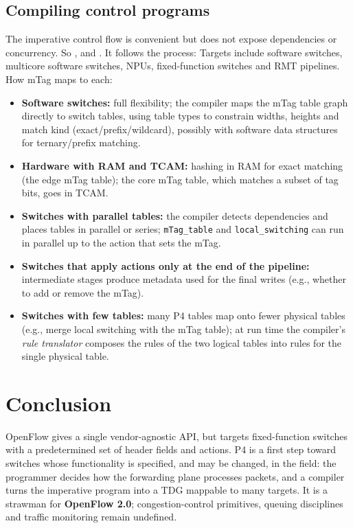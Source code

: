 \subsection{Compiling control programs}
The imperative control flow is convenient but does not expose dependencies or concurrency. So , and . It follows the  process:  Targets include software switches, multicore software switches, NPUs, fixed-function switches and RMT pipelines. How mTag maps to each:
\begin{itemize}
\item \textbf{Software switches:} full flexibility; the compiler maps the mTag table graph directly to switch tables, using table types to constrain widths, heights and match kind (exact/prefix/wildcard), possibly with software data structures for ternary/prefix matching.
\item \textbf{Hardware with RAM and TCAM:} hashing in RAM for exact matching (the edge mTag table); the core mTag table, which matches a subset of tag bits, goes in TCAM.
\item \textbf{Switches with parallel tables:} the compiler detects dependencies and places tables in parallel or series; \texttt{mTag\_table} and \texttt{local\_switching} can run in parallel up to the action that sets the mTag.
\item \textbf{Switches that apply actions only at the end of the pipeline:} intermediate stages produce metadata used for the final writes (e.g., whether to add or remove the mTag).
\item \textbf{Switches with few tables:} many P4 tables map onto fewer physical tables (e.g., merge local switching with the mTag table); at run time the compiler's \emph{rule translator} composes the rules of the two logical tables into rules for the single physical table.
\end{itemize}

\section{Conclusion}
OpenFlow gives a single vendor-agnostic API, but targets fixed-function switches with a predetermined set of header fields and actions. P4 is a first step toward switches whose functionality is specified, and may be changed, in the field: the programmer decides how the forwarding plane processes packets, and a compiler turns the imperative program into a TDG mappable to many targets. It is a strawman for \textbf{OpenFlow 2.0}; congestion-control primitives, queuing disciplines and traffic monitoring remain undefined.

